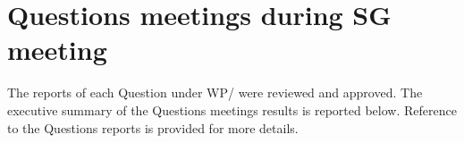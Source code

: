 
\section{Questions meetings during SG\studyGroup{} meeting}\label{questions-meetings-during-sg-meeting}

The reports of each Question under WP\workingParty/\studyGroup{} were reviewed and approved. The executive summary of the Questions meetings results is reported below. Reference to the Questions reports is provided for more details.


